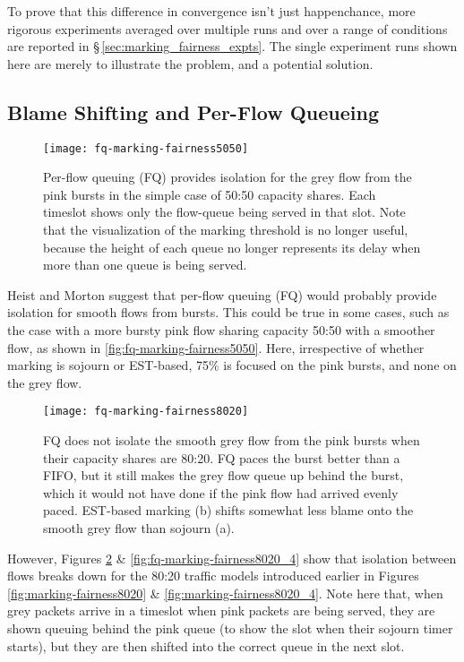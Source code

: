 To prove that this difference in convergence isn't just happenchance, more rigorous experiments averaged over multiple runs and over a range of conditions are reported in \S\,\ref{sec:marking_fairness_expts}. The single experiment runs shown here are merely to illustrate the problem, and a potential solution. 

\subsection{Blame Shifting and Per-Flow Queueing}\label{sec:fq_blame_shifting}

\begin{figure}[h]
	\centering
	\texttt{[image: fq-marking-fairness5050]}
	\caption{Per-flow queuing (FQ) provides isolation for the grey flow from the pink bursts in the simple case of 50:50 capacity shares. Each timeslot shows only the flow-queue being served in that slot. Note that the visualization of the marking threshold is no longer useful, because the height of each queue no longer represents its delay when more than one queue is being served.}\label{fig:fq-marking-fairness5050}
\end{figure}

Heist and Morton \cite{Heist20:L4S_tests} suggest that per-flow queuing (FQ) would probably provide isolation for smooth flows from bursts. This could be true in some cases, such as the case with a more bursty pink flow sharing capacity 50:50 with a smoother flow, as shown in \autoref{fig:fq-marking-fairness5050}. Here, irrespective of whether marking is sojourn or EST-based, 75\% is focused on the pink bursts, and none on the grey flow.

\begin{figure}[h]
	\centering
	\texttt{[image: fq-marking-fairness8020]}
	\caption{FQ does not isolate the smooth grey flow from the pink bursts when their capacity shares are 80:20. FQ paces the burst better than a FIFO, but it still makes the grey flow queue up behind the burst, which it would not have done if the pink flow had arrived evenly paced. EST-based marking (b) shifts somewhat less blame onto the smooth grey flow than sojourn (a).}\label{fig:fq-marking-fairness8020}
\end{figure}

However, Figures \ref{fig:fq-marking-fairness8020} \& \ref{fig:fq-marking-fairness8020_4} show that isolation between flows breaks down for the 80:20 traffic models introduced earlier in Figures \ref{fig:marking-fairness8020} \& \ref{fig:marking-fairness8020_4}. Note here that, when grey packets arrive in a timeslot when pink packets are being served, they are shown queuing behind the pink queue (to show the slot when their sojourn timer starts), but they are then shifted into the correct queue in the next slot.

